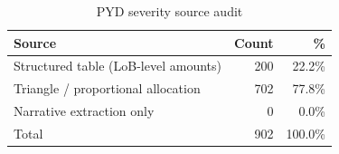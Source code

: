 \begin{table}[htbp]
\centering
\caption{PYD severity source audit}
\label{tab:pyd_source_audit}
\begin{tabular}{lrr}
\toprule
\textbf{Source} & \textbf{Count} & \textbf{\%} \\
\midrule
Structured table (LoB-level amounts) & 200 & 22.2\% \\
Triangle / proportional allocation & 702 & 77.8\% \\
Narrative extraction only & 0 & 0.0\% \\
\midrule
Total & 902 & 100.0\% \\
\bottomrule
\end{tabular}
\end{table}
